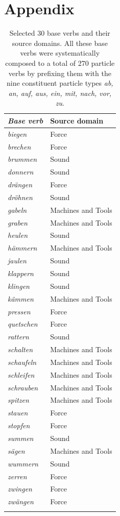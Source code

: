 \documentclass[output=paper]{langsci/langscibook}
\begin{document}

{\sloppy\printbibliography[heading=subbibliography,notkeyword=this]}


\newpage
\section*{Appendix}\largerpage[2]
\begin{table}[H]
  \caption{Selected 30 base verbs and their source domains. All these
    base verbs were systematically composed to a total of 270 particle
    verbs by prefixing them with the nine constituent particle types
    \textit{ab, an, auf, aus, ein, mit, nach, vor, zu}.\label{tab:bv-sd}}
  \begin{tabular}{>{\itshape}ll}
    \lsptoprule
    \normalfont Base verb & Source domain \\ \midrule
    biegen & Force \\
    brechen & Force \\
    brummen & Sound \\
    donnern & Sound \\
    drängen & Force \\
    dröhnen & Sound \\
    gabeln & Machines and Tools \\
    graben & Machines and Tools \\
    heulen & Sound \\
    hämmern & Machines and Tools \\
    jaulen & Sound \\
    klappern & Sound \\
    klingen & Sound \\
    kämmen & Machines and Tools \\
    pressen & Force \\
    quetschen & Force \\
    rattern & Sound \\
    schalten & Machines and Tools \\
    schaufeln & Machines and Tools \\
    schleifen & Machines and Tools \\
    schrauben & Machines and Tools \\
    spitzen & Machines and Tools \\
    stauen & Force \\
    stopfen & Force \\
    summen & Sound \\
    sägen & Machines and Tools \\
    wummern & Sound \\
    zerren & Force \\
    zwingen & Force \\
    zwängen & Force \\
    \lspbottomrule
  \end{tabular}
\end{table}
\end{document}
